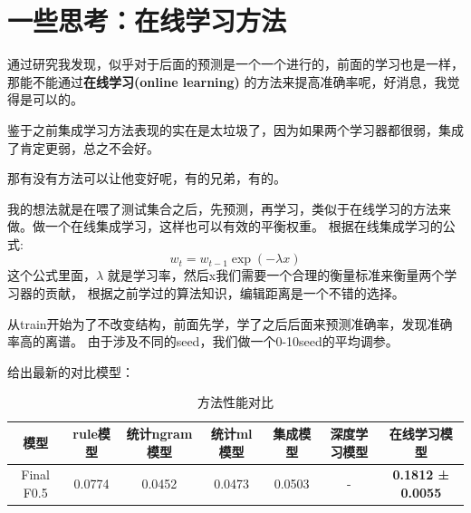 \documentclass[answers]{exam}  %
\begin{document}
\section{一些思考：在线学习方法}

通过研究我发现，似乎对于后面的预测是一个一个进行的，前面的学习也是一样，那能不能通过\textbf{在线学习(online learning)}
的方法来提高准确率呢，好消息，我觉得是可以的。

鉴于之前集成学习方法表现的实在是太垃圾了，因为如果两个学习器都很弱，集成了肯定更弱，总之不会好。

那有没有方法可以让他变好呢，有的兄弟，有的。

我的想法就是在喂了测试集合之后，先预测，再学习，类似于在线学习的方法来做。做一个在线集成学习，这样也可以有效的平衡权重。
根据在线集成学习的公式:
\[ w_t = w_{t-1} \exp(-\lambda x) \]
这个公式里面，$\lambda$ 就是学习率，然后x我们需要一个合理的衡量标准来衡量两个学习器的贡献，
根据之前学过的算法知识，编辑距离是一个不错的选择。

从train开始为了不改变结构，前面先学，学了之后后面来预测准确率，发现准确率高的离谱。
由于涉及不同的seed，我们做一个0-10seed的平均调参。

给出最新的对比模型：

\begin{table}[h]
    \centering
    \begin{tabular}{ccccccc}
    \toprule
    \textbf{模型} & \textbf{rule模型} & \textbf{统计ngram模型} & \textbf{统计ml模型} & \textbf{集成模型} & \textbf{深度学习模型} &\textbf{在线学习模型}\\
    \midrule
    Final F0.5 & 0.0774 & 0.0452 & 0.0473 & 0.0503 & - & \textbf{0.1812 ± 0.0055} \\
    \bottomrule
    \end{tabular}
    \caption{方法性能对比}
    \end{table}
\end{document}
